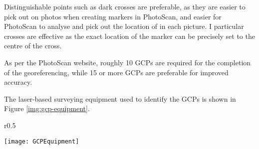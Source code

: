 Distinguishable points such as dark crosses are preferable, as they are easier
to pick out on photos when creating markers in PhotoScan, and easier for
PhotoScan to analyse and pick out the location of in each picture. I particular
crosses are effective as the exact location of the marker can be precisely set
to the centre of the cross.

As per the PhotoScan
website,
roughly 10 GCPs are required for the completion of the georeferencing, while 15
or more GCPs are preferable for improved accuracy.

The laser-based surveying equipment used to identify the GCPs is shown in Figure
\ref{img:gcp-equipment}.

\begin{wrapfigure}{r}{0.5\textwidth}
    \begin{center}
        \texttt{[image: GCPEquipment]}
        \caption{The equipment used to survey in Ground Control Points.}
        \label{img:gcp-equipment}
    \end{center}
\end{wrapfigure}
